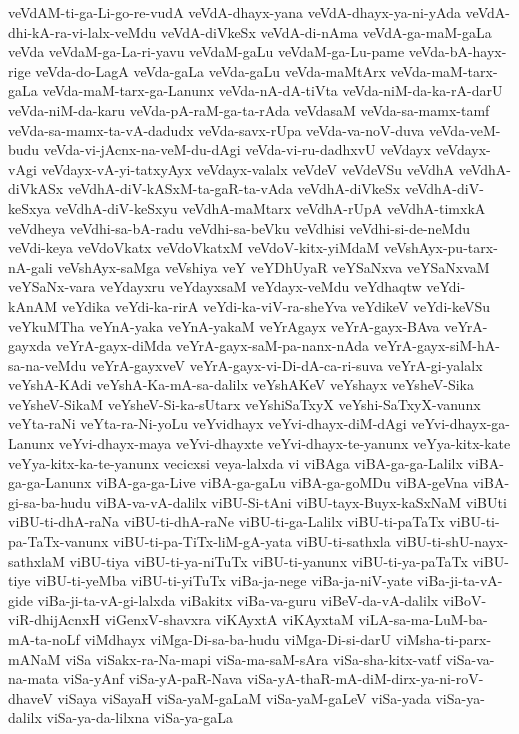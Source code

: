 {veVdAM-ti-ga-Li-go-re-vudA
veVdA-dhayx-yana
veVdA-dhayx-ya-ni-yAda
veVdA-dhi-kA-ra-vi-lalx-veMdu
veVdA-diVkeSx
veVdA-di-nAma
veVdA-ga-maM-gaLa
veVda
veVdaM-ga-La-ri-yavu
veVdaM-gaLu
veVdaM-ga-Lu-pame
veVda-bA-hayx-rige
veVda-do-LagA
veVda-gaLa
veVda-gaLu
veVda-maMtArx
veVda-maM-tarx-gaLa
veVda-maM-tarx-ga-Lanunx
veVda-nA-dA-tiVta
veVda-niM-da-ka-rA-darU
veVda-niM-da-karu
veVda-pA-raM-ga-ta-rAda
veVdasaM
veVda-sa-mamx-tamf
veVda-sa-mamx-ta-vA-dadudx
veVda-savx-rUpa
veVda-va-noV-duva
veVda-veM-budu
veVda-vi-jAcnx-na-veM-du-dAgi
veVda-vi-ru-dadhxvU
veVdayx
veVdayx-vAgi
veVdayx-vA-yi-tatxyAyx
veVdayx-valalx
veVdeV
veVdeVSu
veVdhA
veVdhA-diVkASx
veVdhA-diV-kASxM-ta-gaR-ta-vAda
veVdhA-diVkeSx
veVdhA-diV-keSxya
veVdhA-diV-keSxyu
veVdhA-maMtarx
veVdhA-rUpA
veVdhA-timxkA
veVdheya
veVdhi-sa-bA-radu
veVdhi-sa-beVku
veVdhisi
veVdhi-si-de-neMdu
veVdi-keya
veVdoVkatx
veVdoVkatxM
veVdoV-kitx-yiMdaM
veVshAyx-pu-tarx-nA-gali
veVshAyx-saMga
veVshiya
veY
veYDhUyaR
veYSaNxva
veYSaNxvaM
veYSaNx-vara
veYdayxru
veYdayxsaM
veYdayx-veMdu
veYdhaqtw
veYdi-kAnAM
veYdika
veYdi-ka-rirA
veYdi-ka-viV-ra-sheYva
veYdikeV
veYdi-keVSu
veYkuMTha
veYnA-yaka
veYnA-yakaM
veYrAgayx
veYrA-gayx-BAva
veYrA-gayxda
veYrA-gayx-diMda
veYrA-gayx-saM-pa-nanx-nAda
veYrA-gayx-siM-hA-sa-na-veMdu
veYrA-gayxveV
veYrA-gayx-vi-Di-dA-ca-ri-suva
veYrA-gi-yalalx
veYshA-KAdi
veYshA-Ka-mA-sa-dalilx
veYshAKeV
veYshayx
veYsheV-Sika
veYsheV-SikaM
veYsheV-Si-ka-sUtarx
veYshiSaTxyX
veYshi-SaTxyX-vanunx
veYta-raNi
veYta-ra-Ni-yoLu
veYvidhayx
veYvi-dhayx-diM-dAgi
veYvi-dhayx-ga-Lanunx
veYvi-dhayx-maya
veYvi-dhayxte
veYvi-dhayx-te-yanunx
veYya-kitx-kate
veYya-kitx-ka-te-yanunx
vecicxsi
veya-lalxda
vi
viBAga
viBA-ga-ga-Lalilx
viBA-ga-ga-Lanunx
viBA-ga-ga-Live
viBA-ga-gaLu
viBA-ga-goMDu
viBA-geVna
viBA-gi-sa-ba-hudu
viBA-va-vA-dalilx
viBU-Si-tAni
viBU-tayx-Buyx-kaSxNaM
viBUti
viBU-ti-dhA-raNa
viBU-ti-dhA-raNe
viBU-ti-ga-Lalilx
viBU-ti-paTaTx
viBU-ti-pa-TaTx-vanunx
viBU-ti-pa-TiTx-liM-gA-yata
viBU-ti-sathxla
viBU-ti-shU-nayx-sathxlaM
viBU-tiya
viBU-ti-ya-niTuTx
viBU-ti-yanunx
viBU-ti-ya-paTaTx
viBU-tiye
viBU-ti-yeMba
viBU-ti-yiTuTx
viBa-ja-nege
viBa-ja-niV-yate
viBa-ji-ta-vA-gide
viBa-ji-ta-vA-gi-lalxda
viBakitx
viBa-va-guru
viBeV-da-vA-dalilx
viBoV-viR-dhijAcnxH
viGenxV-shavxra
viKAyxtA
viKAyxtaM
viLA-sa-ma-LuM-ba-mA-ta-noLf
viMdhayx
viMga-Di-sa-ba-hudu
viMga-Di-si-darU
viMsha-ti-parx-mANaM
viSa
viSakx-ra-Na-mapi
viSa-ma-saM-sAra
viSa-sha-kitx-vatf
viSa-va-na-mata
viSa-yAnf
viSa-yA-paR-Nava
viSa-yA-thaR-mA-diM-dirx-ya-ni-roV-dhaveV
viSaya
viSayaH
viSa-yaM-gaLaM
viSa-yaM-gaLeV
viSa-yada
viSa-ya-dalilx
viSa-ya-da-lilxna
viSa-ya-gaLa
}

